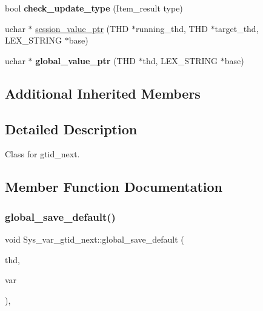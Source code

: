 \begin{DoxyCompactItemize}
\mbox{\label{classSys__var__gtid__next_ab924a90137f6676c4f44992ebdc8fefc}} 
bool {\bfseries check\+\_\+update\+\_\+type} (Item\+\_\+result type)
\item 
uchar $\ast$ \mbox{\hyperlink{classSys__var__gtid__next_ac722dd24aaa78bec018a831e13864bd4}{session\+\_\+value\+\_\+ptr}} (T\+HD $\ast$running\+\_\+thd, T\+HD $\ast$target\+\_\+thd, L\+E\+X\+\_\+\+S\+T\+R\+I\+NG $\ast$base)
\item 
\mbox{\label{classSys__var__gtid__next_a7b3bc978b944ebf086d5c871f72836f9}} 
uchar $\ast$ {\bfseries global\+\_\+value\+\_\+ptr} (T\+HD $\ast$thd, L\+E\+X\+\_\+\+S\+T\+R\+I\+NG $\ast$base)
\end{DoxyCompactItemize}
\subsection*{Additional Inherited Members}


\subsection{Detailed Description}
Class for gtid\+\_\+next. 

\subsection{Member Function Documentation}
\mbox{\label{classSys__var__gtid__next_a2a742d621214309dd7bcdeacc7321c72}} 
\subsubsection{\texorpdfstring{global\+\_\+save\+\_\+default()}{global\_save\_default()}}
{\footnotesize\ttfamily void Sys\+\_\+var\+\_\+gtid\+\_\+next\+::global\+\_\+save\+\_\+default (\begin{DoxyParamCaption}\item[{T\+HD $\ast$}]{thd,  }\item[{\mbox{\hyperlink{classset__var}{set\+\_\+var}} $\ast$}]{var }\end{DoxyParamCaption})\hspace{0.3cm}{\ttfamily [inline]}, {\ttfamily [virtual]}}

